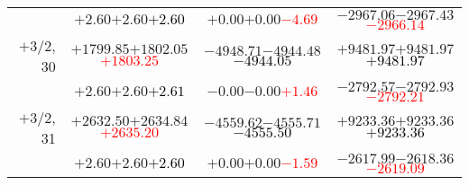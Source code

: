 \documentclass[compress]{beamer}
\begin{document}
\begin{frame}
{\begin{tabular}{r | c | c | c}
           & $+2.60$\hspace{0.1 cm}$+2.60$\hspace{0.1 cm}\textcolor{black}{$+2.60$} & $+0.00$\hspace{0.1 cm}$+0.00$\hspace{0.1 cm}\textcolor{red}{$-4.69$} & $-2967.06$\hspace{0.1 cm}$-2967.43$\hspace{0.1 cm}\textcolor{red}{$-2966.14$} \\
$+$3/2, 30 & $+1799.85$\hspace{0.1 cm}$+1802.05$\hspace{0.1 cm}\textcolor{red}{$+1803.25$} & $-4948.71$\hspace{0.1 cm}$-4944.48$\hspace{0.1 cm}\textcolor{black}{$-4944.05$} & $+9481.97$\hspace{0.1 cm}$+9481.97$\hspace{0.1 cm}\textcolor{black}{$+9481.97$} \\
           & $+2.60$\hspace{0.1 cm}$+2.60$\hspace{0.1 cm}\textcolor{black}{$+2.61$} & $-0.00$\hspace{0.1 cm}$-0.00$\hspace{0.1 cm}\textcolor{red}{$+1.46$} & $-2792.57$\hspace{0.1 cm}$-2792.93$\hspace{0.1 cm}\textcolor{red}{$-2792.21$} \\
$+$3/2, 31 & $+2632.50$\hspace{0.1 cm}$+2634.84$\hspace{0.1 cm}\textcolor{red}{$+2635.20$} & $-4559.62$\hspace{0.1 cm}$-4555.71$\hspace{0.1 cm}\textcolor{black}{$-4555.50$} & $+9233.36$\hspace{0.1 cm}$+9233.36$\hspace{0.1 cm}\textcolor{black}{$+9233.36$} \\
           & $+2.60$\hspace{0.1 cm}$+2.60$\hspace{0.1 cm}\textcolor{black}{$+2.60$} & $+0.00$\hspace{0.1 cm}$+0.00$\hspace{0.1 cm}\textcolor{red}{$-1.59$} & $-2617.99$\hspace{0.1 cm}$-2618.36$\hspace{0.1 cm}\textcolor{red}{$-2619.09$} \\

\end{tabular}}
\end{frame}
\end{document}
